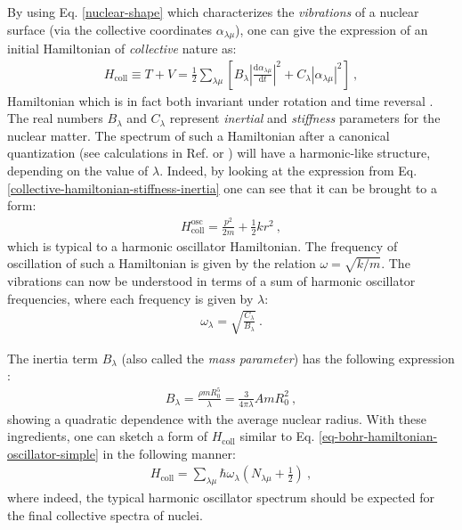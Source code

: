 By using Eq. \ref{nuclear-shape} which characterizes the \emph{vibrations} of a nuclear surface (via the collective coordinates $\alpha_{\lambda\mu}$), one can give the expression of an initial Hamiltonian of \emph{collective} nature as:
\begin{align}
    H_\text{coll}\equiv T+V=\frac{1}{2}\sum_{\lambda\mu}\left[B_\lambda\left|\frac{\text{d}\alpha_{\lambda\mu}}{\text{d}t}\right|^2+C_\lambda|\alpha_{\lambda\mu}|^2\right]\ ,
    \label{collective-hamiltonian-stiffness-inertia}
\end{align}
Hamiltonian which is in fact both invariant under rotation and time reversal \cite{messiah2014quantum}.  The real numbers $B_\lambda$ and $C_\lambda$ represent \emph{inertial} and \emph{stiffness} parameters for the nuclear matter. The spectrum of such a Hamiltonian after a canonical quantization (see calculations in Ref. \cite{ring2004nuclear} or \cite{bertulani2007nuclear}) will have a harmonic-like structure, depending on the value of $\lambda$. Indeed, by looking at the expression from Eq. \ref{collective-hamiltonian-stiffness-inertia} one can see that it can be brought to a form:
\begin{align}
    H_\text{coll}^\text{osc}=\frac{p^2}{2m}+\frac{1}{2}kr^2\ ,
    \label{eq-bohr-hamiltonian-oscillator-simple}
\end{align}
which is typical to a harmonic oscillator Hamiltonian. The frequency of oscillation of such a Hamiltonian is given by the relation $\omega=\sqrt{k/m}$. The vibrations can now be understood in terms of a sum of harmonic oscillator frequencies, where each frequency is given by $\lambda$:
\begin{align}
\omega_\lambda=\sqrt{\frac{C_\lambda}{B_\lambda}}\ .
\end{align}

The inertia term $B_\lambda$ (also called the \emph{mass parameter}) has the following expression \cite{ring2004nuclear}:
\begin{align}
    B_\lambda=\frac{\rho mR_0^5}{\lambda}=\frac{3}{4\pi\lambda}AmR_0^2\ ,
\end{align}
showing a quadratic dependence with the average nuclear radius. With these ingredients, one can sketch a form of $H_\text{coll}$ similar to Eq. \ref{eq-bohr-hamiltonian-oscillator-simple} in the following manner:
\begin{align}
    H_\text{coll}=\sum_{\lambda\mu}\hbar\omega_\lambda\left(N_{\lambda\mu}+\frac{1}{2}\right)\ ,
\end{align}
where indeed, the typical harmonic oscillator spectrum should be expected for the final collective spectra of nuclei.

